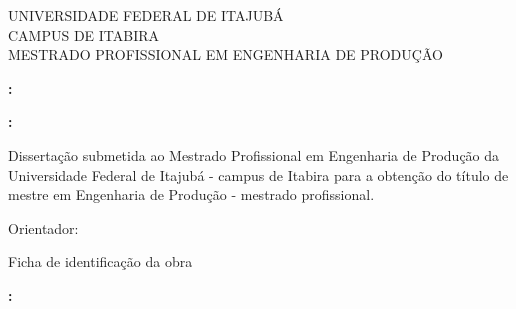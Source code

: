     \onehalfspacing \begin{center}
        UNIVERSIDADE FEDERAL DE ITAJUBÁ\\
        CAMPUS DE ITABIRA \\
        MESTRADO PROFISSIONAL EM ENGENHARIA DE PRODUÇÃO 
    \end{center}
    \vspace{5cm}
    \center \AuthorName
    \vspace{5cm}
    \center \Title \textbf{:} \Subtitle
    \null\vfil
    \center \Location
    \center \Year
    \pagestyle{empty}
    \pagebreak

    \center \AuthorName
    \vspace{9cm}
    \center \Title \textbf{:} \Subtitle

    \vspace{4cm}
    \begin{changemargin}{8cm}{0cm} 
        \begin{fontsize}{10}{12} \selectfont
            Dissertação submetida ao Mestrado Profissional em Engenharia de Produção da Universidade Federal de Itajubá - campus de Itabira para a obtenção do título de mestre em Engenharia de Produção - mestrado profissional.  
            
            Orientador: \Supervisor
        \end{fontsize}
    \end{changemargin}
    \null\vfil
    \center \Location
    \center \Year
    \pagebreak

    \center

    \null\vfil \vspace{12cm}

    Ficha de identificação da obra

    \pagebreak

    \center
    \AuthorName
    \vspace{1cm}

    \Title \textbf{:} \Subtitle
    \vspace{1cm}


